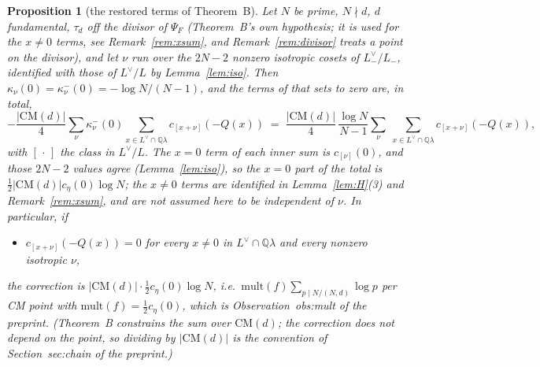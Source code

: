 \documentclass[11pt,reqno]{amsart}
\theoremstyle{plain}
\newtheorem{proposition}[theorem]{Proposition}
\theoremstyle{definition}
\newcommand{\Q}{\mathbb{Q}}
\newcommand{\Ldual}{L^{\vee}}
\newcommand{\Lm}{L_{-}}
\begin{document}
\begin{proposition}[the restored terms of Theorem~B]\label{prop:mult}
Let $N$ be prime, $N\nmid d$, $d$ fundamental, $\tau_d$ off the divisor of $\Psi_F$ (Theorem~B's own
hypothesis; it is used for the $x\neq0$ terms, see Remark~\ref{rem:xsum}, and Remark~\ref{rem:divisor}
treats a point on the divisor), and let $\nu$ run over the $2N-2$ nonzero isotropic
cosets of $\Lm^\vee/\Lm$, identified with those of $\Ldual/L$ by Lemma~\ref{lem:iso}. Then
$\kappa_\nu(0)=\kappa^-_\nu(0)=-\log N/(N-1)$, and the terms of \cite[Thm.~B]{GY} that
\cite[(11)]{Yang} sets to zero are, in total,
\[
  -\frac{\lvert\mathrm{CM}(d)\rvert}{4}\sum_{\nu}\kappa^-_\nu(0)
     \sum_{x\in\Ldual\cap\Q\lambda}c_{[x+\nu]}(-Q(x))
  \;=\;\frac{\lvert\mathrm{CM}(d)\rvert}{4}\,\frac{\log N}{N-1}
     \sum_{\nu}\ \sum_{x\in\Ldual\cap\Q\lambda}c_{[x+\nu]}(-Q(x)),
\]
with $[\,\cdot\,]$ the class in $\Ldual/L$. The $x=0$ term of each inner sum is $c_{[\nu]}(0)$, and
those $2N-2$ values agree (Lemma~\ref{lem:iso}), so the $x=0$ part of the total is
$\tfrac12\lvert\mathrm{CM}(d)\rvert c_\eta(0)\log N$; the $x\neq0$ terms are identified in
Lemma~\ref{lem:H}(3) and Remark~\ref{rem:xsum}, and are not assumed here to be independent of
$\nu$. In particular, if
\begin{itemize}
\item[(H)] $c_{[x+\nu]}(-Q(x))=0$ for every $x\neq0$ in $\Ldual\cap\Q\lambda$ and every nonzero
      isotropic $\nu$,
\end{itemize}
the correction is $\lvert\mathrm{CM}(d)\rvert\cdot\tfrac12c_\eta(0)\log N$, i.e.\
$\mathrm{mult}(f)\sum_{p\mid N/(N,d)}\log p$ per CM point with $\mathrm{mult}(f)=\tfrac12c_\eta(0)$,
which is \textup{Observation~obs:mult of the preprint}. (Theorem~B constrains the sum over $\mathrm{CM}(d)$; the
correction does not depend on the point, so dividing by $\lvert\mathrm{CM}(d)\rvert$ is the
convention of \textup{Section~sec:chain of the preprint}.)
\end{proposition}
\end{document}
